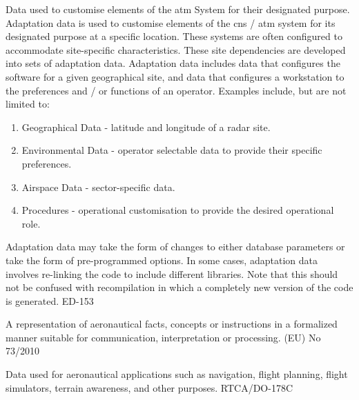 %
	{Data used to customise elements of the \gls{atm} System for their designated purpose.
		Adaptation data is used to customise elements of the \gls{cns} / \gls{atm} system for its designated purpose at a specific location.
		These systems are often configured to accommodate site-specific characteristics.
		These site dependencies are developed into sets of adaptation data.
		Adaptation data includes data that configures the software for a given geographical site, and data that configures a workstation to the preferences and / or functions of an operator.
		Examples include, but are not limited to:
		\begin{enumerate}
			\item Geographical Data - latitude and longitude of a radar site.
			\item Environmental Data - operator selectable data to provide their specific preferences.
			\item Airspace Data - sector-specific data.
			\item Procedures - operational customisation to provide the desired operational role.
		\end{enumerate}
		Adaptation data may take the form of changes to either database parameters or take the form of pre-programmed options.
		In some cases, adaptation data involves re-linking the code to include different libraries.
		Note that this should not be confused with recompilation in which a completely new version of the code is generated. ED-153 \cite{citation:ED153}}

%
{A representation of aeronautical facts, concepts or instructions in a formalized manner suitable for communication, interpretation or processing. (EU) No 73/2010 \cite{citation:EU732010}

Data used for aeronautical applications such as navigation, flight planning, flight simulators, terrain awareness, and other purposes. RTCA/DO-178C \cite{citation:ED12C}}




